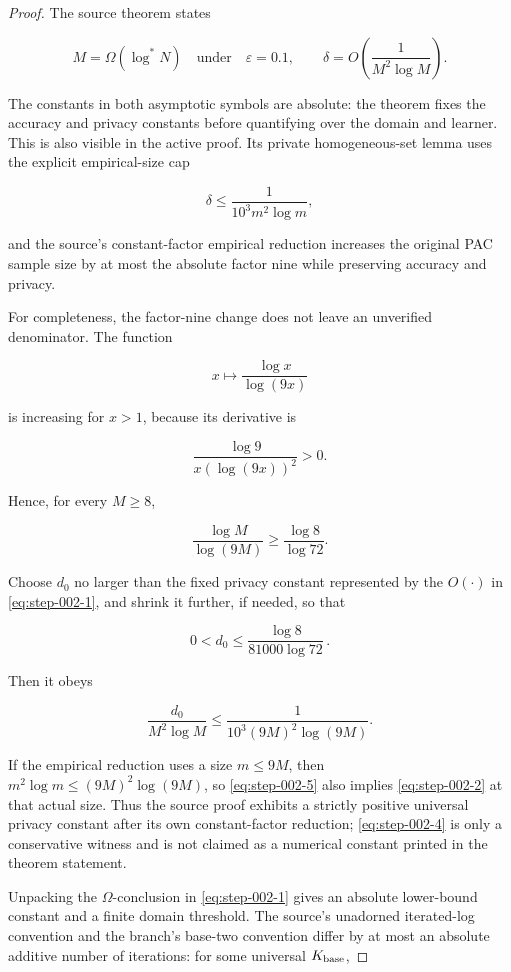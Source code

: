 \begin{proof}
The source theorem states

\[
M=\Omega(\log^*N)
\quad\text{under}\quad
\varepsilon=0.1,\qquad
\delta=O\!\left(\frac1{M^2\log M}\right).
\tag{S2.1}\label{eq:step-002-1}
\]

The constants in both asymptotic symbols are absolute: the theorem fixes the accuracy and privacy constants before quantifying over the domain and learner. This is also visible in the active proof. Its private homogeneous-set lemma uses the explicit empirical-size cap

\[
\delta\le \frac1{10^3m^2\log m},
\tag{S2.2}\label{eq:step-002-2}
\]

and the source's constant-factor empirical reduction increases the original
PAC sample size by at most the absolute factor nine while preserving accuracy
and privacy.

For completeness, the factor-nine change does not leave an unverified denominator. The function

\[
x\longmapsto \frac{\log x}{\log(9x)}
\]

is increasing for \(x>1\), because its derivative is

\[
\frac{\log 9}{x(\log(9x))^2}>0.
\]

Hence, for every \(M\ge8\),

\[
\frac{\log M}{\log(9M)}
\ge \frac{\log8}{\log72}.
\tag{S2.3}\label{eq:step-002-3}
\]

Choose \(d_0\) no larger than the fixed privacy constant represented by the
\(O(\cdot)\) in \eqref{eq:step-002-1}, and shrink it further, if needed, so that

\[
0<d_0\le \frac{\log8}{81000\log72}\,.
\tag{S2.4}\label{eq:step-002-4}
\]

Then it obeys

\[
\frac{d_0}{M^2\log M}
\le
\frac1{10^3(9M)^2\log(9M)}.
\tag{S2.5}\label{eq:step-002-5}
\]

If the empirical reduction uses a size \(m\le9M\), then
\(m^2\log m\le(9M)^2\log(9M)\), so \eqref{eq:step-002-5} also implies \eqref{eq:step-002-2} at that actual
size. Thus the source proof exhibits a strictly positive universal privacy
constant after its own constant-factor reduction; \eqref{eq:step-002-4} is only a conservative
witness and is not claimed as a numerical constant printed in the theorem
statement.

Unpacking the \(\Omega\)-conclusion in \eqref{eq:step-002-1} gives an absolute lower-bound constant and a finite domain threshold. The source's unadorned iterated-log convention and the branch's base-two convention differ by at most an absolute additive number of iterations: for some universal \(K_{\rm base}\),


\end{proof}
